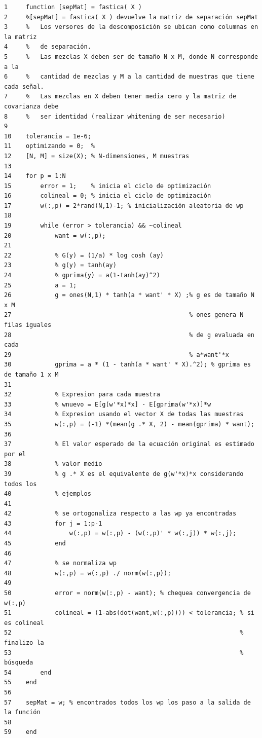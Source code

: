 \documentclass[11pt,a4paper,final]{article}
\begin{document}
\begin{verbatim}
1     function [sepMat] = fastica( X )
2     %[sepMat] = fastica( X ) devuelve la matriz de separación sepMat
3     %   Los versores de la descomposición se ubican como columnas en la matriz
4     %   de separación.
5     %   Las mezclas X deben ser de tamaño N x M, donde N corresponde a la
6     %   cantidad de mezclas y M a la cantidad de muestras que tiene cada señal.
7     %   Las mezclas en X deben tener media cero y la matriz de covarianza debe
8     %   ser identidad (realizar whitening de ser necesario)
9     
10    tolerancia = 1e-6; 
11    optimizando = 0;  %
12    [N, M] = size(X); % N-dimensiones, M muestras
13    
14    for p = 1:N
15        error = 1;    % inicia el ciclo de optimización
16        colineal = 0; % inicia el ciclo de optimización
17        w(:,p) = 2*rand(N,1)-1; % inicialización aleatoria de wp
18        
19        while (error > tolerancia) && ~colineal
20            want = w(:,p);
21            
22            % G(y) = (1/a) * log cosh (ay)
23            % g(y) = tanh(ay)
24            % gprima(y) = a(1-tanh(ay)^2)
25            a = 1;
26            g = ones(N,1) * tanh(a * want' * X) ;% g es de tamaño N x M
27                                                 % ones genera N filas iguales
28                                                 % de g evaluada en cada
29                                                 % a*want'*x
30            gprima = a * (1 - tanh(a * want' * X).^2); % gprima es de tamaño 1 x M
31            
32            % Expresion para cada muestra
33            % wnuevo = E[g(w'*x)*x] - E[gprima(w'*x)]*w
34            % Expresion usando el vector X de todas las muestras
35            w(:,p) = (-1) *(mean(g .* X, 2) - mean(gprima) * want);
36                 
37            % El valor esperado de la ecuación original es estimado por el 
38            % valor medio
39            % g .* X es el equivalente de g(w'*x)*x considerando todos los
40            % ejemplos
41            
42            % se ortogonaliza respecto a las wp ya encontradas
43            for j = 1:p-1
44                w(:,p) = w(:,p) - (w(:,p)' * w(:,j)) * w(:,j);
45            end
46            
47            % se normaliza wp
48            w(:,p) = w(:,p) ./ norm(w(:,p));
49            
50            error = norm(w(:,p) - want); % chequea convergencia de w(:,p)
51            colineal = (1-abs(dot(want,w(:,p)))) < tolerancia; % si es colineal
52                                                               % finalizo la
53                                                               % búsqueda
54        end
55    end
56    
57    sepMat = w; % encontrados todos los wp los paso a la salida de la función
58    
59    end
\end{verbatim}
    
\end{document}
